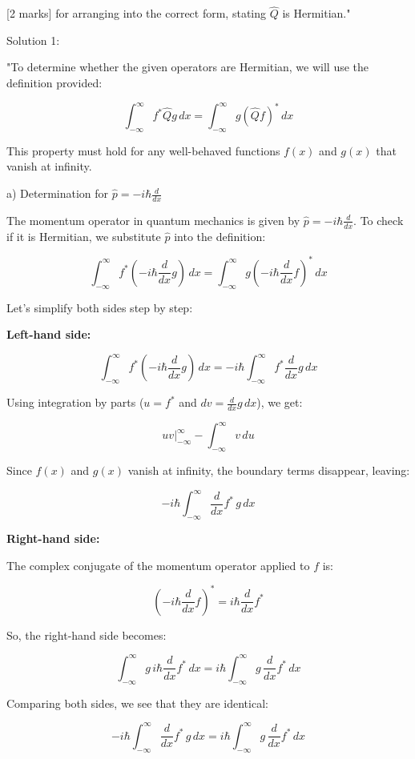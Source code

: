 [2 marks] for arranging into the correct form, stating \(\hat{Q}\) is Hermitian."

Solution 1: 

"To determine whether the given operators are Hermitian, we will use the definition provided:

\[ \int_{-\infty}^{\infty} f^{*}\hat{Q}g \, dx = \int_{-\infty}^{\infty} g(\hat{Q}f)^{*} \, dx \]

This property must hold for any well-behaved functions \(f(x)\) and \(g(x)\) that vanish at infinity.

a) Determination for \( \hat{p} = -i\hbar\frac{d}{dx} \)

The momentum operator in quantum mechanics is given by \( \hat{p} = -i\hbar\frac{d}{dx} \). To check if it is Hermitian, we substitute \(\hat{p}\) into the definition:

\[ \int_{-\infty}^{\infty} f^{*}(-i\hbar\frac{d}{dx}g) \, dx = \int_{-\infty}^{\infty} g(-i\hbar\frac{d}{dx}f)^{*} \, dx \]

Let's simplify both sides step by step:

\textbf{Left-hand side:}

\[ \int_{-\infty}^{\infty} f^{*}(-i\hbar\frac{d}{dx}g) \, dx = -i\hbar \int_{-\infty}^{\infty} f^{*}\frac{d}{dx}g \, dx \]

Using integration by parts (\( u = f^{*} \) and \( dv = \frac{d}{dx}g \, dx \)), we get:

\[ uv \Big|_{-\infty}^{\infty} - \int_{-\infty}^{\infty} v \, du \]

Since \(f(x)\) and \(g(x)\) vanish at infinity, the boundary terms disappear, leaving:

\[ -i\hbar \int_{-\infty}^{\infty} \frac{d}{dx}f^{*} \, g \, dx \]

\textbf{Right-hand side:}

The complex conjugate of the momentum operator applied to \(f\) is:

\[ \left( -i\hbar\frac{d}{dx}f \right)^{*} = i\hbar\frac{d}{dx}f^{*} \]

So, the right-hand side becomes:

\[ \int_{-\infty}^{\infty} g \, i\hbar\frac{d}{dx}f^{*} \, dx = i\hbar \int_{-\infty}^{\infty} g \, \frac{d}{dx}f^{*} \, dx \]

Comparing both sides, we see that they are identical:

\[ -i\hbar \int_{-\infty}^{\infty} \frac{d}{dx}f^{*} \, g \, dx = i\hbar \int_{-\infty}^{\infty} g \, \frac{d}{dx}f^{*} \, dx \]

